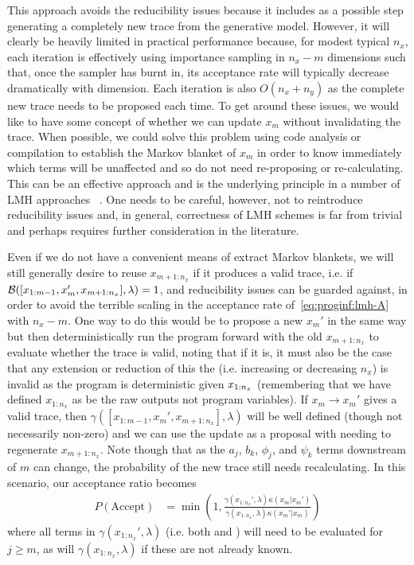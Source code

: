 This approach avoids the reducibility issues because it
includes as a possible step generating a completely new trace from the generative model.  However,
it will clearly be heavily limited in practical performance because, for modest typical $n_x$, each iteration
is effectively using importance sampling in $n_x-m$ dimensions such that, once the sampler has burnt in,
its acceptance rate will typically decrease dramatically with dimension.  Each iteration is also $O(n_x+n_y)$ as
the complete new trace needs to be proposed each time.  To get around these issues, we would like
to have some concept of whether we can update $x_m$ without invalidating the trace.  When possible,
we could solve this problem using code analysis or compilation to establish the Markov blanket of $x_m$ in order to know
immediately which terms will be unaffected and so do not need re-proposing or re-calculating.
This can be an effective approach and is the underlying principle in a number of LMH 
approaches ~\cite{yang2014generating,mansinghka2014venture,ritchie2016c3}.  One needs to be
careful, however, not to reintroduce reducibility issues and, in general, correctness of LMH schemes is
far from trivial and perhaps requires further consideration in the literature.

Even if we do not have a convenient means of extract Markov blankets, we will still generally desire
to reuse $x_{m+1:n_x}$ if it produces a valid trace, i.e. if $\mathcal{B} ([x_{1:m-1},x_m',x_{m+1:n_x}],\lambda)=1$, and reducibility
issues can be guarded against, in order to avoid the terrible scaling in the acceptance rate 
of~\ref{eq:proginf:lmh-A}  with $n_x-m$.  One way to do this would be to propose
a new $x_m'$ in the same way but then deterministically run the program forward with the old
$x_{m+1:n_x}$ to evaluate whether the trace is valid, noting that if it is, it must also be the case that any 
extension or reduction of this the (i.e. increasing or decreasing
$n_x$) is invalid as the program is deterministic given $x_{1:n_x}$ (remembering that we
have defined $x_{1:n_x}$ as be the raw \sample outputs not program variables).  If $x_m \rightarrow x_m'$ gives
a valid trace, then $\gamma([x_{1:m-1},x_m',x_{m+1:n_x}],\lambda)$ will be well defined (though not necessarily
non-zero) and we can use the update as a proposal with needing to regenerate $x_{m+1:n_x}$.  Note though
that as the $a_j$, $b_k$, $\phi_j$, and $\psi_k$ terms downstream of $m$ can change, the 
probability of the new trace still needs recalculating.  In this scenario, our acceptance ratio becomes
\begin{align}
  P(\text{Accept}) &= \min\left(1, \frac{\gamma(x_{1:n_x}',\lambda) \kappa(x_m | x_{m}')  }
  {\gamma(x_{1:n_x},\lambda) \kappa(x_m' | x_{m})  }\right)
\end{align}
where all terms in $\gamma(x_{1:n_x}',\lambda)$ (i.e. both \sample and \observe) will need
to be evaluated for $j\ge m$, as will $\gamma(x_{1:n_x},\lambda)$ if these are not already known. 

